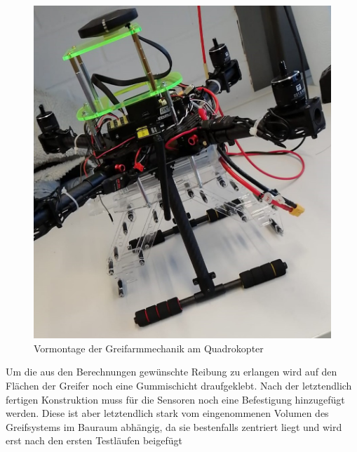 \begin{figure}
\begin{center}
\includegraphics[scale=0.4]{Grafiken/Fotoquadrokopter.jpg}
\caption{Vormontage der Greifarmmechanik am Quadrokopter}
\label{vormontage}
\end{center}
\end{figure}

Um die aus den Berechnungen gewünschte Reibung zu erlangen wird auf den Flächen der Greifer noch eine Gummischicht draufgeklebt.
Nach der letztendlich fertigen Konstruktion muss für die Sensoren noch eine Befestigung hinzugefügt werden. Diese ist aber letztendlich stark vom eingenommenen Volumen des Greifsystems im Bauraum abhängig, da sie bestenfalls zentriert liegt und wird erst nach den ersten Testläufen beigefügt

